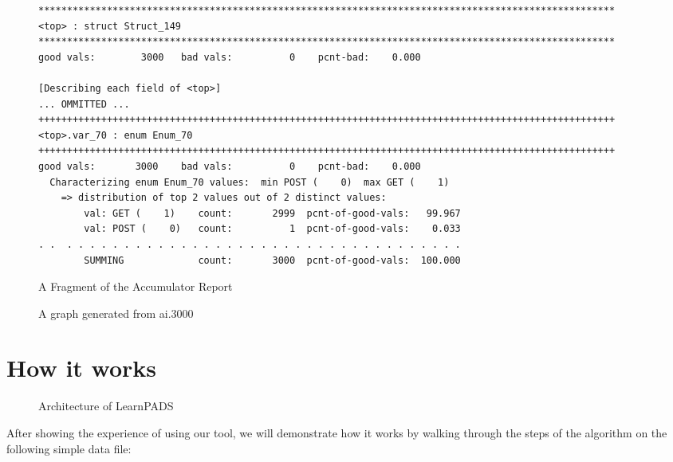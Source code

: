 \documentclass[preprint]{sig-alternate-sigmod08}
\begin{document}
\begin{figure*}
\begin{center}
{\small
\begin{verbatim}
*****************************************************************************************************
<top> : struct Struct_149
*****************************************************************************************************
good vals:        3000   bad vals:          0    pcnt-bad:    0.000

[Describing each field of <top>]
... OMMITTED ...
+++++++++++++++++++++++++++++++++++++++++++++++++++++++++++++++++++++++++++++++++++++++++++++++++++++
<top>.var_70 : enum Enum_70
+++++++++++++++++++++++++++++++++++++++++++++++++++++++++++++++++++++++++++++++++++++++++++++++++++++
good vals:       3000    bad vals:          0    pcnt-bad:    0.000
  Characterizing enum Enum_70 values:  min POST (    0)  max GET (    1)
    => distribution of top 2 values out of 2 distinct values:
        val: GET (    1)    count:       2999  pcnt-of-good-vals:   99.967
        val: POST (    0)   count:          1  pcnt-of-good-vals:    0.033
. .  . . . . . . . . . . . . . . . . . . . . . . . . . . . . . . . . . . .
        SUMMING             count:       3000  pcnt-of-good-vals:  100.000
\end{verbatim}
}
\caption{A Fragment of the Accumulator Report}\label{fig-accum-report}
\end{center}
\end{figure*}

\begin{figure}[th]
\begin{center}
\caption{A graph generated from ai.3000} \label{fig-graph}
\vspace*{-5mm}
\end{center}
\end{figure}

\section{How it works}
\begin{figure}
\begin{center}
\caption{Architecture of LearnPADS}
\vspace*{-5mm}
\label{fig-archi}
\end{center}
\end{figure}
After showing the experience of using our tool, we will demonstrate
how it works by walking through the steps of the algorithm on the
following simple data file:
\end{document}
